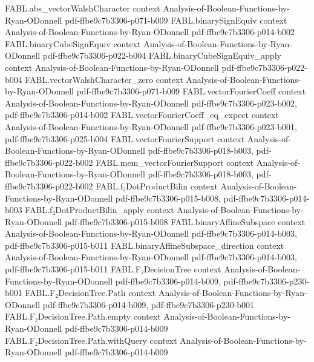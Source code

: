 \begin{theorem}
\proofstep
  {FABL.abs_vectorWalshCharacter}
  {context}
  {Analysis-of-Boolean-Functions-by-Ryan-ODonnell}
  {pdf-ffbe9c7b3306-p071-b009}
\proofstep
  {FABL.binarySignEquiv}
  {context}
  {Analysis-of-Boolean-Functions-by-Ryan-ODonnell}
  {pdf-ffbe9c7b3306-p014-b002}
\proofstep
  {FABL.binaryCubeSignEquiv}
  {context}
  {Analysis-of-Boolean-Functions-by-Ryan-ODonnell}
  {pdf-ffbe9c7b3306-p022-b004}
\proofstep
  {FABL.binaryCubeSignEquiv_apply}
  {context}
  {Analysis-of-Boolean-Functions-by-Ryan-ODonnell}
  {pdf-ffbe9c7b3306-p022-b004}
\proofstep
  {FABL.vectorWalshCharacter_zero}
  {context}
  {Analysis-of-Boolean-Functions-by-Ryan-ODonnell}
  {pdf-ffbe9c7b3306-p071-b009}
\proofstep
  {FABL.vectorFourierCoeff}
  {context}
  {Analysis-of-Boolean-Functions-by-Ryan-ODonnell}
  {pdf-ffbe9c7b3306-p023-b002,
    pdf-ffbe9c7b3306-p014-b002}
\proofstep
  {FABL.vectorFourierCoeff_eq_expect}
  {context}
  {Analysis-of-Boolean-Functions-by-Ryan-ODonnell}
  {pdf-ffbe9c7b3306-p023-b001,
    pdf-ffbe9c7b3306-p025-b004}
\proofstep
  {FABL.vectorFourierSupport}
  {context}
  {Analysis-of-Boolean-Functions-by-Ryan-ODonnell}
  {pdf-ffbe9c7b3306-p018-b003,
    pdf-ffbe9c7b3306-p022-b002}
\proofstep
  {FABL.mem_vectorFourierSupport}
  {context}
  {Analysis-of-Boolean-Functions-by-Ryan-ODonnell}
  {pdf-ffbe9c7b3306-p018-b003,
    pdf-ffbe9c7b3306-p022-b002}
\proofstep
  {FABL.f₂DotProductBilin}
  {context}
  {Analysis-of-Boolean-Functions-by-Ryan-ODonnell}
  {pdf-ffbe9c7b3306-p015-b008,
    pdf-ffbe9c7b3306-p014-b003}
\proofstep
  {FABL.f₂DotProductBilin_apply}
  {context}
  {Analysis-of-Boolean-Functions-by-Ryan-ODonnell}
  {pdf-ffbe9c7b3306-p015-b008}
\proofstep
  {FABL.binaryAffineSubspace}
  {context}
  {Analysis-of-Boolean-Functions-by-Ryan-ODonnell}
  {pdf-ffbe9c7b3306-p014-b003,
    pdf-ffbe9c7b3306-p015-b011}
\proofstep
  {FABL.binaryAffineSubspace_direction}
  {context}
  {Analysis-of-Boolean-Functions-by-Ryan-ODonnell}
  {pdf-ffbe9c7b3306-p014-b003,
    pdf-ffbe9c7b3306-p015-b011}
\proofstep
  {FABL.F₂DecisionTree}
  {context}
  {Analysis-of-Boolean-Functions-by-Ryan-ODonnell}
  {pdf-ffbe9c7b3306-p014-b009,
    pdf-ffbe9c7b3306-p230-b001}
\proofstep
  {FABL.F₂DecisionTree.Path}
  {context}
  {Analysis-of-Boolean-Functions-by-Ryan-ODonnell}
  {pdf-ffbe9c7b3306-p014-b009,
    pdf-ffbe9c7b3306-p230-b001}
\proofstep
  {FABL.F₂DecisionTree.Path.empty}
  {context}
  {Analysis-of-Boolean-Functions-by-Ryan-ODonnell}
  {pdf-ffbe9c7b3306-p014-b009}
\proofstep
  {FABL.F₂DecisionTree.Path.withQuery}
  {context}
  {Analysis-of-Boolean-Functions-by-Ryan-ODonnell}
  {pdf-ffbe9c7b3306-p014-b009}

\end{theorem}
